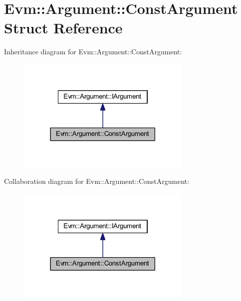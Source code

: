 \hypertarget{struct_evm_1_1_argument_1_1_const_argument}{}\section{Evm\+:\+:Argument\+:\+:Const\+Argument Struct Reference}
\label{struct_evm_1_1_argument_1_1_const_argument}


Inheritance diagram for Evm\+:\+:Argument\+:\+:Const\+Argument\+:
\nopagebreak
\begin{figure}[H]
\begin{center}
\leavevmode
\includegraphics[width=237pt]{struct_evm_1_1_argument_1_1_const_argument__inherit__graph}
\end{center}
\end{figure}


Collaboration diagram for Evm\+:\+:Argument\+:\+:Const\+Argument\+:
\nopagebreak
\begin{figure}[H]
\begin{center}
\leavevmode
\includegraphics[width=237pt]{struct_evm_1_1_argument_1_1_const_argument__coll__graph}
\end{center}
\end{figure}
